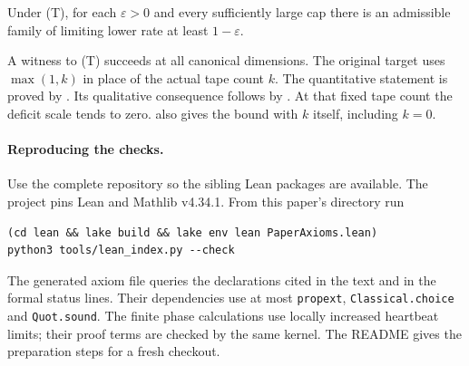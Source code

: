 \begin{corollary}\label{cor:formal}
Under \textnormal{(T)}, for each $\varepsilon>0$ and every sufficiently large
cap there is an admissible family of limiting lower rate at least
$1-\varepsilon$.
\end{corollary}
\begin{outline}
A witness to (T) succeeds at all canonical dimensions. The original target uses $\max(1,k)$ in place of the actual tape count
$k$. The quantitative statement is proved by . Its qualitative consequence follows by . At that fixed tape
count the deficit scale tends to zero.  also gives the
bound with $k$ itself, including $k=0$.
\end{outline}

\paragraph{Reproducing the checks.}
Use the complete repository so the sibling Lean packages are available.
The project pins Lean and Mathlib v4.34.1. From this paper's directory run
\begin{verbatim}
(cd lean && lake build && lake env lean PaperAxioms.lean)
python3 tools/lean_index.py --check
\end{verbatim}
The generated axiom file queries the declarations cited in the text and
in the formal status lines. Their dependencies use at most
\texttt{propext}, \texttt{Classical.choice} and \texttt{Quot.sound}.
The finite phase calculations use locally increased heartbeat limits;
their proof terms are checked by the same kernel.
The README gives the preparation steps for a fresh checkout.
